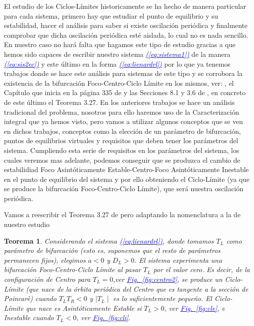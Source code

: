 \documentclass[12pt,a4paper]{report} %
\newtheorem{theorem}{Teorema}[chapter]
\newcommand{\fref}[1]{\hyperref[#1]{\textcolor{blue}{\textit{Fig.~\ref*{#1}}}}}
\newcommand{\eref}[1]{\hyperref[#1]{\textcolor{blue}{\textit{(\ref*{#1})}}}}
\begin{document}
	\vspace{0.5cm}El estudio de los Ciclos-Límites historicamente se ha hecho de manera particular para cada sistema, primero hay que estudiar el punto de equilibrio y su estabilidad, hacer el análisis para saber si existe oscilación periódica y finalmente comprobar que dicha oscilación periódica esté aislada, lo cual no es nada sencillo. En nuestro caso no hará falta que hagamos este tipo de estudio gracias a que hemos sido capaces de escribir nuestro sistema \eref{eq:sistema1} de la manera \eref{eq:sis2ec} y este último en la forma \eref{eq:lienardrl} por lo que ya tenemos trabajos donde se hace este análisis para sistemas de este tipo y se corrobora la existencia de la bifurcación Foco-Centro-Ciclo Límite en los mismos, ver: \cite{ponce}, el Capítulo que inicia en la página 335 de \cite{ciclolimite} y las Secciones 8.1 y 3.6 de \cite{amarillo}, en concreto de este último el Teorema 3.27. En los anteriores trabajos se hace un análisis tradicional del problema, nosotros para ello haremos uso de la Caracterización integral que ya hemos visto, pero vamos a utilizar algunos conceptos que se ven en dichos trabajos, conceptos como la elección de un parámetro de bifurcación, puntos de equilibrios virtuales y requisitos que deben tener los parámetros del sistema. Cumpliendo esta serie de requisitos en los parámetros del sistema, los cuales veremos mas adelante, podemos conseguir que se produzca el cambio de estabilidiad Foco Asintóticamente Estable-Centro-Foco Asintóticamente Inestable en el punto de equilibrio del sistema y por ello obteniendo el Ciclo-Límite (ya que se produce la bifurcación Foco-Centro-Ciclo Límite), que será nuestra oscilación periódica.
	
	\newpage
	
	\vspace{0.5cm} Vamos a reescribir el Teorema 3.27 de \cite{amarillo} pero adaptando la nomenclatura a la de nuestro estudio
	
	\begin{theorem}
		\label{teo:5.1}
		Considerando el sistema \eref{eq:lienardrl}, donde tomamos $T_L$ como parámetro de bifurcación (esto es, suponemos que el resto de parámetros permanecen fijos), elegimos $a<0$ y $D_L>0$. El sistema experimenta una bifurcación Foco-Centro-Ciclo Límite al pasar $T_L$ por el valor cero. Es decir, de la configuración de Centro para $T_L=0$,ver \fref{fig:centro2}, se produce un Ciclo-Límite (que nace de la órbita periódica del Centro que es tangente a la sección de Poincarè) cuando $T_L T_R<0$ y $\mid T_L \mid$ es lo suficientemente pequeño. El Ciclo-Límite que nace es Asintóticamente Estable si $T_L>0$, ver \fref{fig:cle}, e Inestable cuando $T_L<0$, ver \fref{fig:cli}.
	\end{theorem}
	
\end{document}
